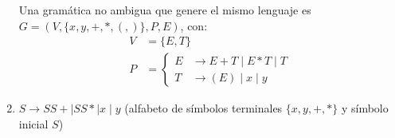 \begin{ejercicio}
\begin{enumerate}
        Una gramática no ambigua que genere el mismo lenguaje es $G=(V,\{x,y,+,*,(,)\},P,E)$, con:
        \begin{equation*}
            \begin{aligned}
                V &= \{ E, T\} \\
                P &= \left\{
                    \begin{aligned}
                        E &\rightarrow E + T \mid E * T\mid T \\
                        T &\rightarrow (E) \mid x \mid y
                    \end{aligned}
                \right.
            \end{aligned}
        \end{equation*}
        \item $S \rightarrow SS + \mid SS * \mid x \mid y$ (alfabeto de símbolos terminales $\{ x, y, +, * \}$ y símbolo inicial $S$)
        
    \end{enumerate}
\end{ejercicio}

